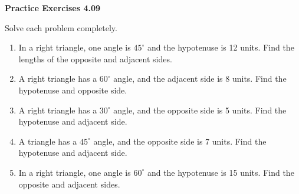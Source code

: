\vspace{0.3ex}
\noindent\textbf{Practice Exercises 4.09}

\vspace{0.2ex}

Solve each problem completely.
\begin{enumerate}
    \item In a right triangle, one angle is \(45^\circ\) and the hypotenuse is 12 units. Find the lengths of the opposite and adjacent sides.
    \item A right triangle has a \(60^\circ\) angle, and the adjacent side is 8 units. Find the hypotenuse and opposite side.
    \item A right triangle has a \(30^\circ\) angle, and the opposite side is 5 units. Find the hypotenuse and adjacent side.
    \item A triangle has a \(45^\circ\) angle, and the opposite side is 7 units. Find the hypotenuse and adjacent side.
    \item In a right triangle, one angle is \(60^\circ\) and the hypotenuse is 15 units. Find the opposite and adjacent sides.
\end{enumerate}
